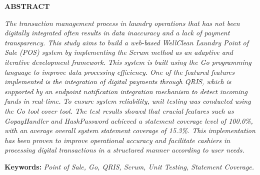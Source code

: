 \begin{center}
    {\fontsize{14}{16}\selectfont\bfseries ABSTRACT}
\end{center}

\vspace{0.5cm}

\begin{singlespace}
\noindent
\textit{The transaction management process in laundry operations that has not been digitally integrated often results in data inaccuracy and a lack of payment transparency. This study aims to build a web-based WellClean Laundry Point of Sale (POS) system by implementing the Scrum method as an adaptive and iterative development framework. This system is built using the Go programming language to improve data processing efficiency. One of the featured features implemented is the integration of digital payments through QRIS, which is supported by an endpoint notification integration mechanism to detect incoming funds in real-time. To ensure system reliability, unit testing was conducted using the Go tool cover tool. The test results showed that crucial features such as GopayHandler and HashPassword achieved a statement coverage level of 100.0\%, with an average overall system statement coverage of 15.3\%. This implementation has been proven to improve operational accuracy and facilitate cashiers in processing digital transactions in a structured manner according to user needs.}
\vspace{0.8cm} %

\noindent
\textbf{Keywords:} \textit{Point of Sale, Go, QRIS, Scrum, Unit Testing, Statement Coverage.}
\end{singlespace}